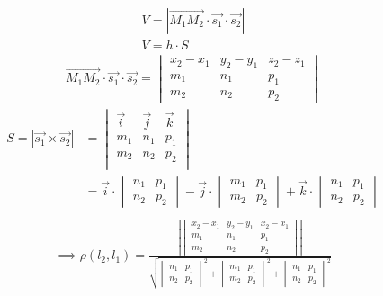 \begin{gather*}
  V = |\overrightarrow{M_1M_2} \cdot \vec{s_1} \cdot \vec{s_2}| \\
  V= h \cdot S
\end{gather*}
\begin{gather*}
  \overrightarrow{M_1M_2} \cdot \vec{s_1} \cdot \vec{s_2} = 
  \begin{vmatrix}
    x_2 - x_1 & y_2 - y_1 & z_2 - z_1 \\
    m_1 & n_1 & p_1 \\
    m_2 & n_2 & p_2
  \end{vmatrix}
\end{gather*}
\begin{align*}
  S = |\vec{s_1} \times \vec{s_2}| &= 
  \begin{vmatrix}
    \vec{i} & \vec{j} & \vec{k} \\
    m_1 & n_1 & p_1 \\
    m_2 & n_2 & p_2 \\
  \end{vmatrix} \\
  &=
  \vec{i} \cdot 
  \begin{vmatrix}
    n_1 & p_1 \\
    n_2 & p_2
  \end{vmatrix} - \vec{j} \cdot 
  \begin{vmatrix}
    m_1 & p_1 \\
    m_2 & p_2
  \end{vmatrix} + \vec{k} \cdot 
  \begin{vmatrix}
    n_1 & p_1 \\
    n_2 & p_2
  \end{vmatrix} \\
\end{align*}
\begin{gather*}
  \implies \boxed{\rho(l_2, l_1) = 
  \frac{
    \left|
    \begin{vmatrix}
      x_2 - x_1 & y_2 - y_1 & x_2 - x_1 \\
      m_1 & n_1 & p_1 \\
      m_2 & n_2 & p_2
    \end{vmatrix}
    \right| 
  }{
  \sqrt{
    \begin{vmatrix}
      n_1 & p_1 \\
      n_2 & p_2
    \end{vmatrix}^2 +
    \begin{vmatrix}
      m_1 & p_1 \\
      m_2 & p_2
    \end{vmatrix}^2 +  
    \begin{vmatrix}
      n_1 & p_1 \\
      n_2 & p_2
    \end{vmatrix}^2 
  } 
  }}
\end{gather*}
  

